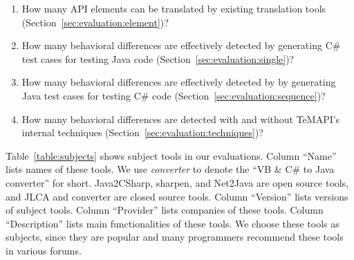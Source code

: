 \vspace*{-1.5ex}
\begin{enumerate}
\item How many API elements can be translated by existing translation tools (Section~\ref{sec:evaluation:element})? \vspace*{-1.8ex}
\item How many behavioral differences are effectively detected by generating C\# test cases for testing Java code (Section~\ref{sec:evaluation:single})?\vspace*{-1.8ex}
\item How many behavioral differences are effectively detected by  by generating Java test cases for testing C\# code (Section~\ref{sec:evaluation:sequence})?\vspace*{-1.8ex}
\item How many behavioral differences are detected with and without TeMAPI's internal techniques (Section~\ref{sec:evaluation:techniques})?
\end{enumerate}\vspace*{-1.5ex}

Table~\ref{table:subjects} shows subject tools in our evaluations. Column ``Name'' lists names of these tools. We use \emph{converter} to denote the ``VB \& C\# to Java converter'' for short. Java2CSharp, sharpen, and Net2Java are open source tools, and JLCA and converter are closed source tools. Column ``Version'' lists versions of subject tools. Column ``Provider'' lists companies of these tools. Column ``Description'' lists main functionalities of these tools. We choose these tools as subjects, since they are popular and many programmers recommend these tools in various forums.


